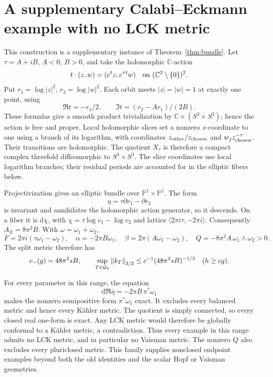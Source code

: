 \documentclass[11pt]{article}
\newcommand{\CP}{\mathbb P}
\newcommand{\norm}[1]{\left\|#1\right\|}
\begin{document}
\section{A supplementary Calabi--Eckmann example with no LCK metric}

This construction is a supplementary instance of
Theorem~\ref{thm:bundle}. Let \(\tau=A+iB\), \(A<0\), \(B>0\), and
take the holomorphic \(\mathbb C\)-action
\[
 t\cdot(z,w)=(e^t z,e^{\tau t}w)
 \quad\hbox{on }(\mathbb C^2\setminus\{0\})^2.
\]
Put \(r_1=\log|z|^2\), \(r_2=\log|w|^2\).
Each orbit meets \(|z|=|w|=1\) at exactly one point, using
\[
 \Re t=-r_1/2,\qquad \Im t=(r_2-A r_1)/(2B).
\]
These formulas give a smooth product trivialization by
\(\mathbb C\times(S^3\times S^3)\); hence the action is free and proper.
Local holomorphic slices set a nonzero \(z\)-coordinate to one using a
branch of its logarithm, with coordinates
\(z_{\rm other}/z_{\rm chosen}\) and \(w_j z_{\rm chosen}^{-\tau}\).
Their transitions are holomorphic. The quotient \(X_\tau\) is therefore
a compact complex threefold diffeomorphic to \(S^3\times S^3\).
The slice coordinates use local logarithm branches; their residual
periods are accounted for in the elliptic fibers below.

Projectivization gives an elliptic bundle over \(\CP^1\times\CP^1\).
The form
\[
 \eta=\tau\partial r_1-\partial r_2
\]
is invariant and annihilates the holomorphic action generator, so it
descends. On a fiber it is \(\mathrm d\chi\), with
\(\chi=\tau\log v_1-\log v_2\) and lattice
\(\langle2\pi i\tau,-2\pi i\rangle\).
Consequently \(A_E=8\pi^2B\). With \(\omega=\omega_1+\omega_2\),
\[
 F=2\pi i(\tau\omega_1-\omega_2),\quad
 \alpha=-2\pi B\omega_1,\quad
 \beta=2\pi(A\omega_1-\omega_2),\quad
 Q=-8\pi^2A\,\omega_1\wedge\omega_2>0.
\]
The split metric therefore has
\[
 v_-(g)=48\pi^2sB,\qquad
 \sup_{T\in{\cal G}_h}\norm{k_T}_{3/2}
                         \le c^{-1}(48\pi^2sB)^{-1/3}
 \quad(h\ge c g).
\]

For every parameter in this range, the equation
\[
 \mathrm d\Re\eta=-2\pi B\,\pi^*\omega_1
\]
makes the nonzero semipositive form \(\pi^*\omega_1\) exact. It excludes
every balanced metric and hence every K\"ahler metric. The quotient is simply connected,
so every closed real one-form is exact. Any LCK metric would therefore
be globally conformal to a K\"ahler metric, a contradiction.
Thus every example in this range admits no LCK metric, and in particular no Vaisman
metric. The nonzero \(Q\) also excludes every pluriclosed metric.
This family supplies nonclosed endpoint examples beyond both the
old identities and the scalar Hopf or Vaisman geometries.
\end{document}
